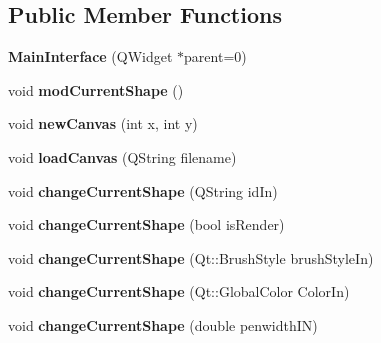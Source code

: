\subsection*{Public Member Functions}
\begin{DoxyCompactItemize}
\item 
\mbox{\label{class_main_interface_a50ec59f9dc5489bbb18baae382dbc7ad}} 
{\bfseries Main\+Interface} (Q\+Widget $\ast$parent=0)
\item 
\mbox{\label{class_main_interface_aa5a995b2c60c8c0db5b20a7ff86967d1}} 
void {\bfseries mod\+Current\+Shape} ()
\item 
\mbox{\label{class_main_interface_a14e51324b57ebe718257526edd9bde1f}} 
void {\bfseries new\+Canvas} (int x, int y)
\item 
\mbox{\label{class_main_interface_a9e6c88b90697f4c22c4f417387178782}} 
void {\bfseries load\+Canvas} (Q\+String filename)
\item 
\mbox{\label{class_main_interface_a166ca373227ab4e426c7c669b5e7cc09}} 
void {\bfseries change\+Current\+Shape} (Q\+String id\+In)
\item 
\mbox{\label{class_main_interface_a7c709f184a028ddfb6b2f61617f76a8b}} 
void {\bfseries change\+Current\+Shape} (bool is\+Render)
\item 
\mbox{\label{class_main_interface_a71ab1f383076fca6850f0dce45ce14a1}} 
void {\bfseries change\+Current\+Shape} (Qt\+::\+Brush\+Style brush\+Style\+In)
\item 
\mbox{\label{class_main_interface_af544e40190178d6bfed28264fac5e58d}} 
void {\bfseries change\+Current\+Shape} (Qt\+::\+Global\+Color Color\+In)
\item 
\mbox{\label{class_main_interface_af108c59184eb9dab9878f1f43524dd25}} 
void {\bfseries change\+Current\+Shape} (double penwidth\+IN)
\item 
\mbox{\label{class_main_interface_ac39889223f88222ab8b8fa624c07c465}} 

\end{DoxyCompactItemize}
